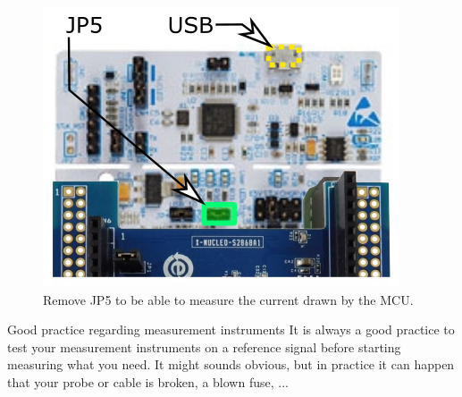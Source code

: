 \begin{figure}[h]
    \centering
    \includegraphics[scale=0.5]{figures/JP5}
    \caption{Remove JP5 to be able to measure the current drawn by the MCU.}
    \label{fig:JP5}
\end{figure}

\begin{bclogo}[couleur = gray!20, arrondi = 0.2, logo=\bcinfo]{Good practice regarding measurement instruments}
It is always a good practice to test your measurement instruments on a reference signal before starting measuring what you need. It might sounds obvious, but in practice it can happen that your probe or cable is broken, a blown fuse, ... \end{bclogo}

